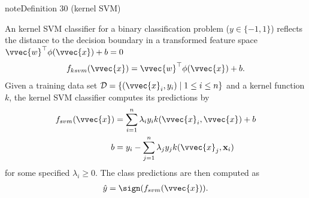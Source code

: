 \documentclass[letterpaper,10pt,english]{jupyterBook}
\begin{document}
\begin{sphinxadmonition}{note}{Definition 30 (kernel SVM)}



\sphinxAtStartPar
An kernel SVM classifier for a binary classification problem (\(y\in\{-1,1\}\)) reflects the distance to the decision boundary in a transformed feature space \(\vvec{w}^\top \phi(\vvec{x})+b=0\)
\begin{equation*}
\begin{split}f_{ksvm}(\vvec{x}) = \vvec{w}^\top \phi(\vvec{x})+b.\end{split}
\end{equation*}
Given a training data set \(\mathcal{D}=\{(\vvec{x}_i,y_i)\mid 1\leq i\leq n\}\) and a kernel function \(k\), the kernel SVM classifier computes its predictions by
\begin{align*}
f_{svm}(\vvec{x})
&= \sum_{i=1}^n \lambda_i y_i k(\vvec{x}_i,\vvec{x}) +b\\
b&= y_{i} - \sum_{j=1}^{n} \lambda_j y_j k(\vvec{x}_j, {\bf x}_{i})
\end{align*}
\sphinxAtStartPar
for some specified \(\lambda_i\geq 0\).
The class predictions are then computed as
\begin{equation*}
\begin{split}\hat{y} = \sign(f_{svm}(\vvec{x})).\end{split}
\end{equation*}
\end{sphinxadmonition}
\end{document}
